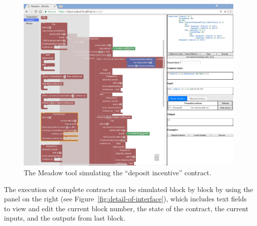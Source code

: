 \documentclass[runningheads]{llncs}
\begin{document}
\begin{figure}[t]
\begin{centering}
\includegraphics[width=1.1\textwidth]{pix/screenshot1}
\par\end{centering}
\caption{\label{fig:full-screenshot-demo}The Meadow tool
simulating the ``deposit incentive'' contract.}
\vspace*{-6mm}
\end{figure}


The execution of complete contracts can be simulated block by block
by using the panel on the right (see Figure~\ref{fig:detail-of-interface}),
which includes text fields to view and edit the current block number,
the state of the contract, the current inputs, and the outputs from
last block.
\end{document}
